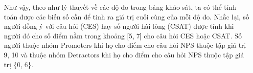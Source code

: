 Như vậy, theo như lý thuyết về các độ đo trong bảng khảo sát, ta có thể tính toán được các biến số cần để tinh ra giá trị cuối cùng của mỗi độ đo.
Nhắc lại, số người đồng ý với câu hỏi (CES) hay số người hài lòng (CSAT) được tính khi người đó cho số điểm nằm trong khoảng [5, 7] cho câu hỏi CES 
hoặc CSAT. Số người thuộc nhóm Promoters khi họ cho điểm cho câu hỏi NPS thuộc tập giá trị {9, 10} và thuộc nhóm Detractors khi họ cho điểm cho câu hỏi 
NPS thuộc tập giá trị \{0, 6\}.
\begin{table}[H]
    \def\arraystretch{1}%
    \centering
    \caption{Bảng kết quả tính toán mỗi câu hỏi}
\end{table}
